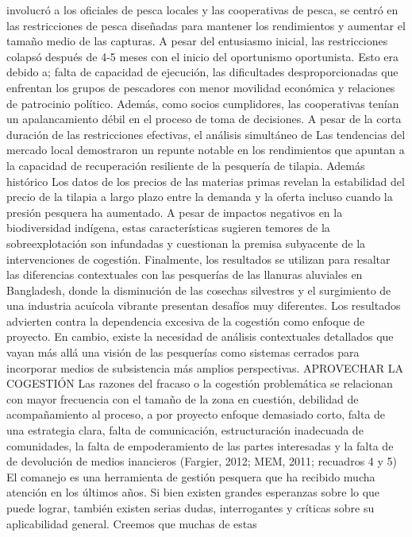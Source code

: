 \documentclass[
]{article}
\begin{document}
involucró a los oficiales de pesca locales y las cooperativas de pesca,
se centró en las restricciones de pesca diseñadas para mantener los
rendimientos y aumentar el tamaño medio de las capturas. A pesar del
entusiasmo inicial, las restricciones colapsó después de 4-5 meses con
el inicio del oportunismo oportunista. Esto era debido a; falta de
capacidad de ejecución, las dificultades desproporcionadas que enfrentan
los grupos de pescadores con menor movilidad económica y relaciones de
patrocinio político. Además, como socios cumplidores, las cooperativas
tenían un apalancamiento débil en el proceso de toma de decisiones. A
pesar de la corta duración de las restricciones efectivas, el análisis
simultáneo de Las tendencias del mercado local demostraron un repunte
notable en los rendimientos que apuntan a la capacidad de recuperación
resiliente de la pesquería de tilapia. Además histórico Los datos de los
precios de las materias primas revelan la estabilidad del precio de la
tilapia a largo plazo entre la demanda y la oferta incluso cuando la
presión pesquera ha aumentado. A pesar de impactos negativos en la
biodiversidad indígena, estas características sugieren temores de la
sobreexplotación son infundadas y cuestionan la premisa subyacente de la
intervenciones de cogestión. Finalmente, los resultados se utilizan para
resaltar las diferencias contextuales con las pesquerías de las llanuras
aluviales en Bangladesh, donde la disminución de las cosechas silvestres
y el surgimiento de una industria acuícola vibrante presentan desafíos
muy diferentes. Los resultados advierten contra la dependencia excesiva
de la cogestión como enfoque de proyecto. En cambio, existe la necesidad
de análisis contextuales detallados que vayan más allá una visión de las
pesquerías como sistemas cerrados para incorporar medios de subsistencia
más amplios perspectivas. APROVECHAR LA COGESTIÓN Las razones del
fracaso o la cogestión problemática se relacionan con mayor frecuencia
con el tamaño de la zona en cuestión, debilidad de acompañamiento al
proceso, a por proyecto enfoque demasiado corto, falta de una estrategia
clara, falta de comunicación, estructuración inadecuada de comunidades,
la falta de empoderamiento de las partes interesadas y la falta de de
devolución de medios inancieros (Fargier, 2012; MEM, 2011; recuadros 4 y
5) El comanejo es una herramienta de gestión pesquera que ha recibido
mucha atención en los últimos años. Si bien existen grandes esperanzas
sobre lo que puede lograr, también existen serias dudas, interrogantes y
críticas sobre su aplicabilidad general. Creemos que muchas de estas
\end{document}
